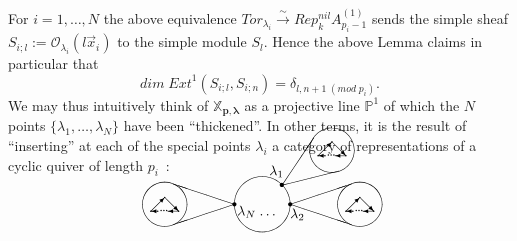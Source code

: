 \documentclass[a4paper,10pt]{amsart}
\def\O{\mathcal{O}}
\def\xpl{\mathbb{X}_{\mathbf{p},\boldsymbol{\lambda}}}
\numberwithin{equation}{section}
\begin{document}
{\vspace{.1in}

For $i=1, \ldots, N$ the above equivalence $Tor_{\lambda_i} \stackrel{\sim}{\to} Rep^{nil}_k A_{p_i-1}^{(1)}$ sends the simple sheaf $S_{i;l}:=\O_{\lambda_i}(l\vec{x}_i)$ to the simple module $S_l$. Hence the above Lemma claims in particular that
$${dim}\;{Ext}^1(S_{i;l},S_{i;n})=\delta_{l,n+1\;(mod\;p_i)}.$$
We may thus intuitively think of $\xpl$ as a projective line $\mathbb{P}^1$ of which the $N$ points $\{\lambda_1, \ldots, \lambda_N\}$ have been ``thickened''. In other terms, it is the result of ``inserting'' at each of the special points $\lambda_i$ a category of representations of a cyclic quiver of length $p_i$~:

\vspace{.55in}

\begin{equation}\label{E:poneNpoints}
\centerline{
\begin{picture}(300,10)
\put(165,14){\line(4,1){40}}
\put(165,15){\line(2,3){22}}
\put(150,0){\circle{40}}
\put(164,14){\circle*{3}}
\put(155,21){$\lambda_1$}
\put(200,39){\circle{30}}
\put(200,45){\circle*{1}}
\put(190,35){\circle*{1}}
\put(195,35){\circle*{1}}
\put(205,35){\circle*{1}}
\put(210,35){\circle*{1}}
\put(190,35){\vector(1,1){10}}
\put(195,35){\vector(-1,0){5}}
\put(210,35){\vector(-1,0){8}}
\put(196,35){$.$}
\put(198,35){$.$}
\put(200,35){$.$}
\put(200,45){\vector(1,-1){10}}
\put(170,-10){$\lambda_2$}
\put(220,0){\circle{30}}
\put(220,5){\circle*{1}}
\put(210,-5){\circle*{1}}
\put(215,-5){\circle*{1}}
\put(225,-5){\circle*{1}}
\put(230,-5){\circle*{1}}
\put(210,-5){\vector(1,1){10}}
\put(215,-5){\vector(-1,0){5}}
\put(230,-5){\vector(-1,0){8}}
\put(216,-5){$.$}
\put(218,-5){$.$}
\put(220,-5){$.$}
\put(220,5){\vector(1,-1){10}}
\put(148,-10){$\cdots$}
\put(132,-8){$\lambda_N$}
\put(170,0){\line(3,1){44}}
\put(170,0){\line(3,-1){44}}
\put(130,0){\line(-3,-1){44}}
\put(130,0){\line(-3,1){44}}
\put(130,0){\circle*{3}}
\put(170,0){\circle*{3}}
\put(80,0){\circle{30}}
\put(80,5){\circle*{1}}
\put(70,-5){\circle*{1}}
\put(75,-5){\circle*{1}}
\put(85,-5){\circle*{1}}
\put(90,-5){\circle*{1}}
\put(70,-5){\vector(1,1){10}}
\put(75,-5){\vector(-1,0){5}}
\put(90,-5){\vector(-1,0){8}}
\put(76,-5){$.$}
\put(78,-5){$.$}
\put(80,-5){$.$}
\put(80,5){\vector(1,-1){10}}
\end{picture}}
\end{equation}

\vspace{.4in}


}
\end{document}
